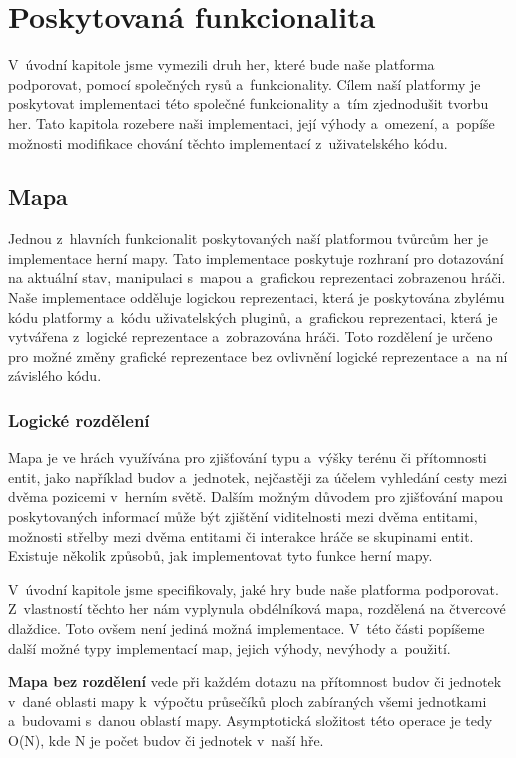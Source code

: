\section{Poskytovaná funkcionalita}
V~úvodní kapitole jsme vymezili druh her, které bude naše platforma podporovat, pomocí společných rysů a~funkcionality. Cílem naší platformy je poskytovat implementaci této společné funkcionality a~tím zjednodušit tvorbu her. Tato kapitola rozebere naši implementaci, její výhody a~omezení, a~popíše možnosti modifikace chování těchto implementací z~uživatelského kódu.

\subsection{Mapa}
\label{sec:mapimpl}
Jednou z~hlavních funkcionalit poskytovaných naší platformou tvůrcům her je implementace herní mapy. Tato implementace poskytuje rozhraní pro dotazování na aktuální stav, manipulaci s~mapou a~grafickou reprezentaci zobrazenou hráči. Naše implementace odděluje logickou reprezentaci, která je poskytována zbylému kódu platformy a~kódu uživatelských pluginů, a~grafickou reprezentaci, která je vytvářena z~logické reprezentace a~zobrazována hráči. Toto rozdělení je určeno pro možné změny grafické reprezentace bez ovlivnění logické reprezentace a~na ní závislého kódu. 

\subsubsection{Logické rozdělení}
\label{sec:maplogic}
Mapa je ve hrách využívána pro zjišťování typu a~výšky terénu či přítomnosti entit, jako například budov a~jednotek, nejčastěji za účelem vyhledání cesty mezi dvěma pozicemi v~herním světě. Dalším možným důvodem pro zjišťování mapou poskytovaných informací může být zjištění viditelnosti mezi dvěma entitami, možnosti střelby mezi dvěma entitami či interakce hráče se skupinami entit.  Existuje několik způsobů, jak implementovat tyto funkce herní mapy.

V~úvodní kapitole jsme specifikovaly, jaké hry bude naše platforma podporovat. Z~vlastností těchto her nám vyplynula obdélníková mapa, rozdělená na čtvercové dlaždice. Toto ovšem není jediná možná implementace. V~této části popíšeme další možné typy implementací map, jejich výhody, nevýhody a~použití.

\textbf{Mapa bez rozdělení} vede při každém dotazu na přítomnost budov či jednotek v~dané oblasti mapy k~výpočtu průsečíků ploch zabíraných všemi jednotkami a~budovami s~danou oblastí mapy. Asymptotická složitost této operace je tedy O(N), kde N je počet budov či jednotek v~naší hře.

